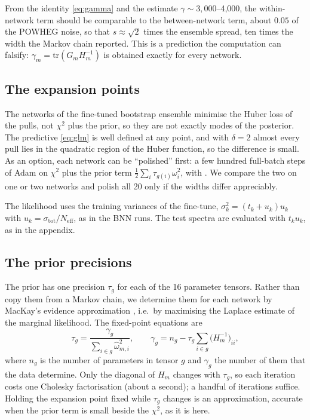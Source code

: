 \begin{keyidea}
From the identity \cref{eq:gamma} and the estimate $\gamma \sim 3{,}000$--4{,}000, the
within-network term should be comparable to the between-network term, about $0.05$ of the
POWHEG noise, so that $s \approx \sqrt2$ times the ensemble spread, ten times the width the
Markov chain reported. This is a prediction the computation can falsify: $\gamma_m =
\mathrm{tr}(G_m H_m^{-1})$ is obtained exactly for every network.
\end{keyidea}

\subsection{The expansion points}

The networks of the fine-tuned bootstrap ensemble minimise the Huber loss of the pulls, not
$\chi^2$ plus the prior, so they are not exactly modes of the posterior. The predictive
\cref{eq:glm} is well defined at any point, and with $\delta = 2$ almost every pull lies in
the quadratic region of the Huber function, so the difference is small. As an option, each
network can be ``polished'' first: a few hundred full-batch steps of Adam on $\chi^2$ plus
the prior term $\tfrac12\sum_i \tau_{g(i)}\omega_i^2$, with . We compare
the two on one or two networks and polish all 20 only if the widths differ appreciably.

\begin{assume}
The likelihood uses the training variances of the fine-tune,
$\sigma_k^2 = (t_k + u_k)u_k$ with $u_k = \sigma_\text{tot}/N_\text{eff}$, as in the BNN
runs. The test spectra are evaluated with $t_k u_k$, as in the appendix.
\end{assume}

\subsection{The prior precisions}
\label{sec:prior}

The prior has one precision $\tau_g$ for each of the 16 parameter tensors. Rather than
copy them from a Markov chain, we determine them for each network by MacKay's evidence
approximation \cite{MacKay:1992}, i.e.\ by maximising the Laplace estimate of the marginal
likelihood. The fixed-point equations are
\begin{equation}
  \tau_g = \frac{\gamma_g}{\sum_{i\in g} \hat\omega_{m,i}^2}, \qquad
  \gamma_g = n_g - \tau_g \sum_{i\in g} \big(H_m^{-1}\big)_{ii} ,
  \label{eq:mackay}
\end{equation}
where $n_g$ is the number of parameters in tensor $g$ and $\gamma_g$ the number of them
that the data determine. Only the diagonal of $H_m$ changes with $\tau_g$, so each iteration
costs one Cholesky factorisation (about a second); a handful of iterations suffice. Holding
the expansion point fixed while $\tau_g$ changes is an approximation, accurate when the
prior term is small beside the $\chi^2$, as it is here.

